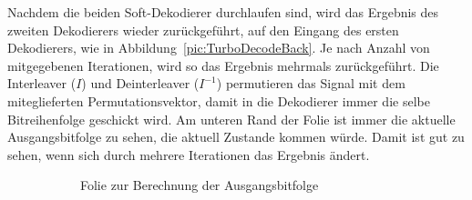 Nachdem die beiden Soft-Dekodierer durchlaufen sind, wird das Ergebnis des zweiten Dekodierers wieder zurückgeführt, auf den Eingang des ersten Dekodierers, wie in Abbildung~\ref{pic:TurboDecodeBack}. Je nach Anzahl von mitgegebenen Iterationen, wird so das Ergebnis mehrmals zurückgeführt. Die Interleaver ($I$) und Deinterleaver ($I^{-1}$) permutieren das Signal mit dem miteglieferten Permutationsvektor, damit in die Dekodierer immer die selbe Bitreihenfolge geschickt wird. Am unteren Rand der Folie ist immer die aktuelle Ausgangsbitfolge zu sehen, die aktuell Zustande kommen würde. Damit ist gut zu sehen, wenn sich durch mehrere Iterationen das Ergebnis ändert.

\begin{figure}[th]
\centering
	\begin{subfigure}{0.45\textwidth}
	\centering	
	\caption{Folie zur Berechnung der Ausgangsbitfolge}
	\label{pic:TurboDecodeResult}
	\end{subfigure}
	\qquad
	\begin{subfigure}{0.45\textwidth}
	\centering

\end{subfigure}
\end{figure}
